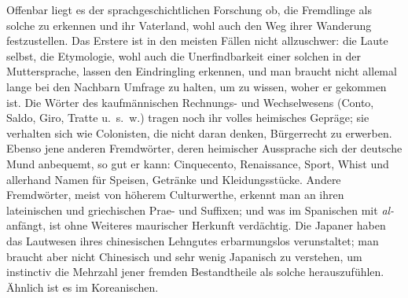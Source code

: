 {Offenbar liegt es der sprachgeschichtlichen Forschung ob, die Fremdlinge als solche zu erkennen und ihr Vaterland, wohl auch den Weg ihrer Wanderung festzustellen. Das Erstere ist in den meisten Fällen nicht allzuschwer: die Laute selbst, die Etymologie, wohl auch die Unerfindbarkeit einer solchen in der Muttersprache, lassen den Eindringling erkennen, und man braucht nicht allemal lange bei den Nachbarn Umfrage zu halten, um zu wissen, woher er gekommen ist. Die Wörter des kaufmännischen Rechnungs- und Wechselwesens (Conto, Saldo, Giro, Tratte u.~s.~w.) tragen noch ihr volles heimisches Gepräge; sie verhalten sich wie Colonisten, die nicht daran denken, Bürgerrecht zu er\-\label{sp.266}werben. Ebenso jene anderen Fremdwörter, deren heimischer Aussprache sich der deutsche Mund anbequemt, so gut er kann: Cinquecento, Renaissance, Sport, Whist und allerhand Namen für Speisen, Getränke und Kleidungsstücke. Andere Fremdwörter, meist von höherem Culturwerthe, erkennt man an ihren lateinischen und griechischen Prae- und Suffixen; und was im Spanischen mit \textit{al-} anfängt, ist ohne Weiteres maurischer Herkunft verdächtig. Die Japaner haben das Lautwesen ihres chinesischen Lehngutes erbarmungslos verunstaltet; man braucht aber nicht Chinesisch und sehr wenig Japanisch zu verstehen, um instinctiv die Mehrzahl jener fremden Bestandtheile als solche herauszufühlen. Ähnlich ist es im Koreanischen.

}
